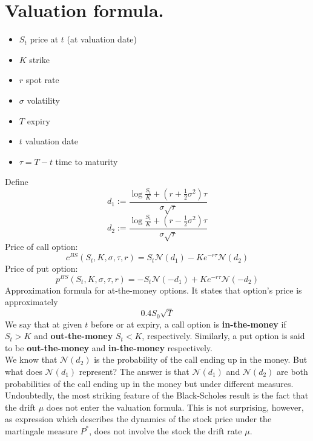 \documentclass{book}
\begin{document}
\section{Valuation formula.}
\begin{itemize}
\item $S_{t}$ price at $t$ (at valuation date)
\item $K$ strike
\item $r$ spot rate
\item $\sigma$ volatility
\item $T$ expiry
\item $t$ valuation date
\item $\tau=T-t$ time to maturity
\end{itemize}
Define
\begin{equation}
\nonumber
d_{1}:=\frac{\log\frac{S_{t}}{K}+(r+\frac{1}{2}\sigma^{2})\tau}{\sigma\sqrt{\tau}}
\end{equation}
\begin{equation}
\nonumber
d_{2}:=\frac{\log\frac{S_{t}}{K}+(r-\frac{1}{2}\sigma^{2})\tau}{\sigma\sqrt{\tau}}
\end{equation}
Price of call option:
\begin{equation}
\nonumber
c^{BS}(S_{t},K,\sigma,\tau,r)=S_{t}\mathcal{N}(d_{1})-Ke^{-r\tau}\mathcal{N}(d_{2})
\end{equation}
Price of put option:
\begin{equation}
\nonumber
p^{BS}(S_{t},K,\sigma,\tau,r)=-S_{t}\mathcal{N}(-d_{1})+Ke^{-r\tau}\mathcal{N}(-d_{2})
\end{equation}
Approximation formula for at-the-money options. It states that option's price is approximately
$$
0.4S_{0}\sqrt{T}
$$ 
We say that at given $t$ before or at expiry, a call option is \textbf{in-the-money} if $S_{t}>K$ and \textbf{out-the-money} $S_{t}<K$, respectively. Similarly, a put option is said to be \textbf{out-the-money} and \textbf{in-the-money} respectively.\\
We know that $\mathcal{N}(d_{2})$ is the probability of the call ending up in the money. But what does $\mathcal{N}(d_{1})$ represent? The answer is that $\mathcal{N}(d_{1})$ and $\mathcal{N}(d_{2})$ are both probabilities of the call ending up in the money but under different measures.\\
Undoubtedly, the most striking feature of the Black-Scholes result is the fact that the drift $\mu$ does not enter the valuation formula. This is not surprising, however, as expression which describes the dynamics of the stock price under the martingale measure $P^{\ast}$, does not involve the stock the drift rate $\mu$.
\end{document}
